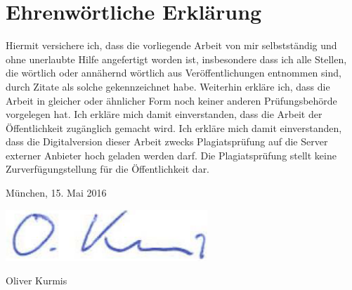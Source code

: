 \newpage

\thispagestyle{empty}

\section*{Ehrenwörtliche Erklärung}  
 
Hiermit  versichere  ich, dass die vorliegende Arbeit von  mir  selbstständig  und 
ohne unerlaubte Hilfe angefertigt worden ist, insbesondere dass ich alle Stellen, 
die wörtlich oder annähernd wörtlich aus Veröffentlichungen entnommen sind, 
durch Zitate als solche gekennzeichnet habe.
Weiterhin erkläre ich, dass die Arbeit in gleicher oder ähnlicher Form noch keiner 
anderen  Prüfungsbehörde  vorgelegen  hat.  Ich  erkläre  mich  damit  einverstanden, 
dass  die  Arbeit  der  Öffentlichkeit  zugänglich  gemacht wird. 
Ich erkläre mich damit einverstanden, dass die Digitalversion dieser 
Arbeit zwecks Plagiatsprüfung auf die Server externer Anbieter hoch geladen 
werden  darf.  Die  Plagiatsprüfung  stellt  keine Zurverfügungstellung  für  die 
Öffentlichkeit dar.
 
München, 15. Mai 2016

\includegraphics[width=.2\textwidth]{img/unterschrift.png}

Oliver Kurmis
